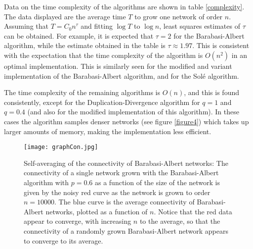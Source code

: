 \documentclass[12pt]{iopart}
\begin{document}
Data on the time complexity of the algorithms are shown in table \ref{complexity}.  The data
displayed are the average time $T$ to grow one network of order $n$.  Assuming
that $T=C_0 n^\tau$ and fitting $\log T$ to $\log n$, least squares estimates of
$\tau$ can be obtained.  For example, it is expected that $\tau=2$ for the Barabasi-Albert
algorithm, while the estimate obtained in the table is $\tau\approx 1.97$.  This is
consistent with the expectation that the time complexity of the algorithm is $O(n^2)$
in an optimal implementation.  This is similarly seen for the modified and variant
implementation of the Barabasi-Albert algorithm, and for the Sol\'e algorithm.

The time complexity of the remaining algorithms is $O(n)$, and this is found consistently,
except for the Duplication-Divergence algorithm for $q=1$ and $q=0.4$ (and also
for the modified implementation of this algorithm).  In these cases the algorithm
samples denser networks (see figure \ref{figure4}) which takes up larger amounts of
memory, making the implementation less efficient.


\begin{figure}[t!]
 \centering
\texttt{[image: graphCon.jpg]}
\caption{{Self-averaging of the connectivity of Barabasi-Albert networks:}
The connectivity of a single network grown with the Barabasi-Albert algorithm with
$p=0.6$ as a function of the size of the network is given by the noisy red curve as
the network is grown to order $n=10000$.  The blue curve is the average connectivity
of Barabasi-Albert networks, plotted as a function of $n$.  Notice that the red data
appear to converge, with increasing $n$ to the average, so that the connectivity of 
a randomly grown Barabasi-Albert network appears to converge to its average.}
\label{figure16}
\end{figure}
\end{document}
